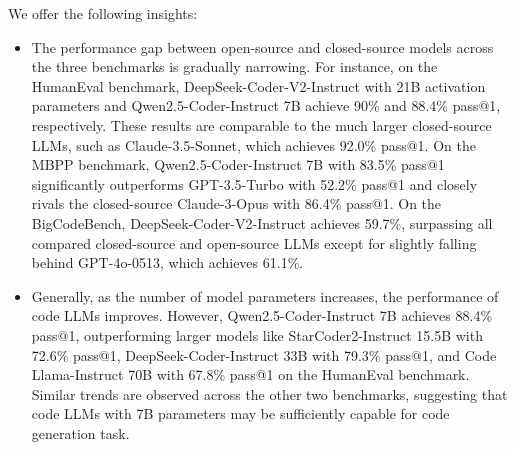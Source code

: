 We offer the following insights:
\begin{itemize}
    \item The performance gap between open-source and closed-source models across the three benchmarks is gradually narrowing. For instance, on the HumanEval benchmark, DeepSeek-Coder-V2-Instruct with 21B activation parameters and Qwen2.5-Coder-Instruct 7B achieve 90\% and 88.4\% pass@1, respectively. 
    These results are comparable to the much larger closed-source LLMs, such as Claude-3.5-Sonnet, which achieves 92.0\% pass@1. 
    On the MBPP benchmark, Qwen2.5-Coder-Instruct 7B with 83.5\% pass@1 significantly outperforms GPT-3.5-Turbo with 52.2\% pass@1 and closely rivals the closed-source Claude-3-Opus with 86.4\% pass@1. 
    On the BigCodeBench, DeepSeek-Coder-V2-Instruct achieves 59.7\%, surpassing all compared closed-source and open-source LLMs except for slightly falling behind GPT-4o-0513, which achieves 61.1\%.
    \item Generally, as the number of model parameters increases, the performance of code LLMs improves. However, Qwen2.5-Coder-Instruct 7B achieves 88.4\% pass@1, outperforming larger models like StarCoder2-Instruct 15.5B with 72.6\% pass@1, DeepSeek-Coder-Instruct 33B with 79.3\% pass@1, and Code Llama-Instruct 70B with 67.8\% pass@1 on the HumanEval benchmark. Similar trends are observed across the other two benchmarks, suggesting that code LLMs with 7B parameters may be sufficiently capable for code generation task.

\end{itemize}
